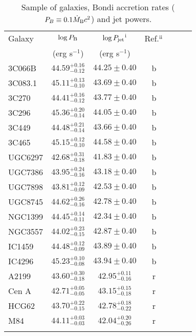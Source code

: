 \documentclass[useAMS,usenatbib]{mn2e}
\begin{document}
\begin{table}
\centering
\caption{Sample of galaxies, Bondi accretion rates ($P_B \equiv 0.1 \dot{M}_{\rm B} c^2$) and jet powers.} 
\begin{tabular}{@{}lcccccc@{}}
\hline
Galaxy & $\log P_{\rm B}$ & $\log P_{\rm jet}$$^{\rm i}$ & Ref.$^{\rm ii}$ \\
& (erg s$^{-1}$) & (erg s$^{-1}$) & \\
\hline
3C066B & $ 44.59 ^{+ 0.16 }_{- 0.12 } $ & $ 44.25 \pm 0.40 $ & b \\ 
3C083.1 & $ 45.11 ^{+ 0.13 }_{- 0.10 } $ & $ 43.69 \pm 0.40 $ & b \\ 
3C270 & $ 44.41 ^{+ 0.16 }_{- 0.12 } $ & $ 43.77 \pm 0.40 $ & b \\ 
3C296 & $ 45.36 ^{+ 0.20 }_{- 0.14 } $ & $ 44.05 \pm 0.40 $ & b \\ 
3C449 & $ 44.48 ^{+ 0.21 }_{- 0.14 } $ & $ 43.66 \pm 0.40 $ & b \\ 
3C465 & $ 45.15 ^{+ 0.12 }_{- 0.10 } $ & $ 44.58 \pm 0.40 $ & b \\ 
UGC6297 & $ 42.68 ^{+ 0.31 }_{- 0.18 } $ & $ 41.83 \pm 0.40 $ & b \\ 
UGC7386 & $ 43.95 ^{+ 0.24 }_{- 0.16 } $ & $ 43.18 \pm 0.40 $ & b \\ 
UGC7898 & $ 43.81 ^{+ 0.12 }_{- 0.09 } $ & $ 42.53 \pm 0.40 $ & b \\ 
UGC8745 & $ 44.62 ^{+ 0.26 }_{- 0.16 } $ & $ 42.78 \pm 0.40 $ & b \\ 
NGC1399 & $ 44.45 ^{+ 0.14 }_{- 0.11 } $ & $ 42.34 \pm 0.40 $ & b \\ 
NGC3557 & $ 44.02 ^{+ 0.23 }_{- 0.15 } $ & $ 42.87 \pm 0.40 $ & b \\ 
IC1459 & $ 44.48 ^{+ 0.12 }_{- 0.09 } $ & $ 43.89 \pm 0.40 $ & b \\ 
IC4296 & $ 45.23 ^{+ 0.10 }_{- 0.08 } $ & $ 43.94 \pm 0.40 $ & b \\ 
A2199 & $ 43.60 ^{+ 0.30 }_{- 0.18 } $ & $ 42.95 ^{+ 0.11 }_{- 0.16 } $ & r \\ 
Cen A & $ 42.71 ^{+ 0.05 }_{- 0.05 } $ & $ 43.15 ^{+ 0.15 }_{- 0.18 } $ & r \\ 
HCG62 & $ 43.70 ^{+ 0.22 }_{- 0.15 } $ & $ 42.78 ^{+ 0.18 }_{- 0.22 } $ & r \\ 
M84 & $ 44.11 ^{+ 0.03 }_{- 0.03 } $ & $ 42.04 ^{+ 0.20 }_{- 0.26 } $ & r \\ 
$$
\end{tabular}
\end{table}
\end{document}

